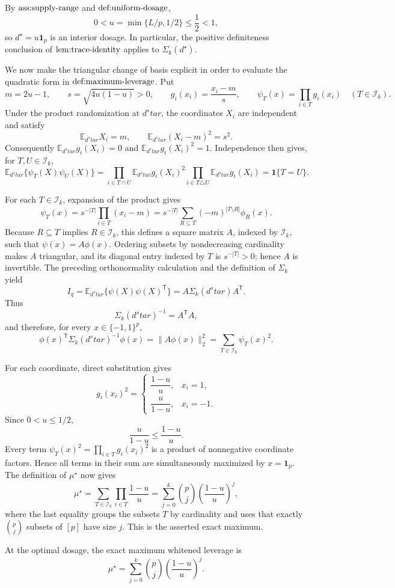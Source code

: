 By \(\textnormal{ass:supply-range}\) and \(\textnormal{def:uniform-dosage}\),
\[
 0<u=\min\{L/p,1/2\}\le \frac12<1,
\]
so \(d^\star=u\mathbf 1_p\) is an interior dosage.  In particular, the positive definiteness conclusion of \(\textnormal{lem:trace-identity}\) applies to \(\Sigma_k(d^\star)\).

We now make the triangular change of basis explicit in order to evaluate the quadratic form in \(\textnormal{def:maximum-leverage}\).  Put
\[
 m=2u-1,
 \qquad
 s=\sqrt{4u(1-u)}>0,
 \qquad
 g_i(x_i)=\frac{x_i-m}{s},
 \qquad
 \psi_T(x)=\prod_{i\in T}g_i(x_i)
 \quad(T\in\mathcal I_k).
\]
Under the product randomization at \(d^star\), the coordinates \(X_i\) are independent and satisfy
\[
 \mathbb E_{d^star}X_i=m,
 \qquad
 \mathbb E_{d^star}(X_i-m)^2=s^2.
\]
Consequently \(\mathbb E_{d^star}g_i(X_i)=0\) and \(\mathbb E_{d^star}g_i(X_i)^2=1\).  Independence then gives, for \(T,U\in\mathcal I_k\),
\[
 \mathbb E_{d^star}\{\psi_T(X)\psi_U(X)\}
 =\prod_{i\in T\cap U}\mathbb E_{d^star}g_i(X_i)^2
   \prod_{i\in T\triangle U}\mathbb E_{d^star}g_i(X_i)
 =\mathbf 1\{T=U\}.
\]

For each \(T\in\mathcal I_k\), expansion of the product gives
\[
 \psi_T(x)
 =s^{-|T|}\prod_{i\in T}(x_i-m)
 =s^{-|T|}\sum_{R\subseteq T}(-m)^{|T\setminus R|}\phi_R(x).
\]
Because \(R\subseteq T\) implies \(R\in\mathcal I_k\), this defines a square matrix \(A\), indexed by \(\mathcal I_k\), such that \(\psi(x)=A\phi(x)\).  Ordering subsets by nondecreasing cardinality makes \(A\) triangular, and its diagonal entry indexed by \(T\) is \(s^{-|T|}>0\); hence \(A\) is invertible.  The preceding orthonormality calculation and the definition of \(\Sigma_k\) yield
\[
 I_q
 =\mathbb E_{d^star}\{\psi(X)\psi(X)^{\mathsf T}\}
 =A\Sigma_k(d^star)A^{\mathsf T}.
\]
Thus
\[
 \Sigma_k(d^star)^{-1}=A^{\mathsf T}A,
\]
and therefore, for every \(x\in\{-1,1\}^p\),
\[
 \phi(x)^{\mathsf T}\Sigma_k(d^star)^{-1}\phi(x)
 =\|A\phi(x)\|_2^2
 =\sum_{T\in\mathcal I_k}\psi_T(x)^2.
\]

For each coordinate, direct substitution gives
\[
 g_i(x_i)^2
 =\begin{cases}
 \dfrac{1-u}{u},&x_i=1,\\[6pt]
 \dfrac{u}{1-u},&x_i=-1.
 \end{cases}
\]
Since \(0<u\le1/2\),
\[
 \frac{u}{1-u}\le\frac{1-u}{u}.
\]
Every term \(\psi_T(x)^2=\prod_{i\in T}g_i(x_i)^2\) is a product of nonnegative coordinate factors.  Hence all terms in their sum are simultaneously maximized by \(x=\mathbf 1_p\).  The definition of \(\mu^\star\) now gives
\[
 \mu^\star
 =\sum_{T\in\mathcal I_k}\prod_{i\in T}\frac{1-u}{u}
 =\sum_{j=0}^{k}\binom pj\left(\frac{1-u}{u}\right)^j,
\]
where the last equality groups the subsets \(T\) by cardinality and uses that exactly \(\binom pj\) subsets of \([p]\) have size \(j\).  This is the asserted exact maximum.

At the optimal dosage, the exact maximum whitened leverage is
\[
\mu^\star=\sum_{j=0}^{k}\binom pj\left(\frac{1-u}{u}\right)^j.
\]
